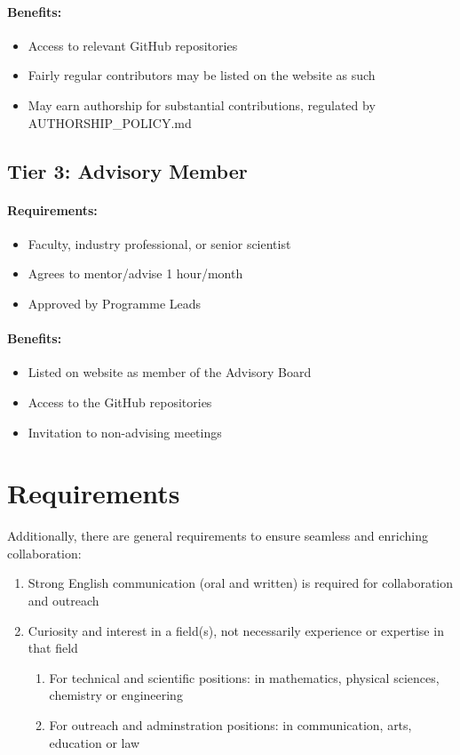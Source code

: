 \documentclass[11pt,a4paper]{article}
\begin{document}
\paragraph{Benefits:}
\begin{itemize}
\item Access to relevant GitHub repositories
\item Fairly regular contributors may be listed on the website as such
\item May earn authorship for substantial contributions, regulated by AUTHORSHIP\_POLICY.md
\end{itemize}

\subsection{Tier 3: Advisory Member}
\paragraph{Requirements:}
\begin{itemize}
\item Faculty, industry professional, or senior scientist
\item Agrees to mentor/advise 1 hour/month
\item Approved by Programme Leads
\end{itemize}

\paragraph{Benefits:}
\begin{itemize}
\item Listed on website as member of the Advisory Board
\item Access to the GitHub repositories
\item Invitation to non-advising meetings
\end{itemize}


\section{Requirements}

Additionally, there are general requirements to ensure seamless and enriching collaboration:
\begin{enumerate}
\item Strong English communication (oral and written) is required for collaboration and outreach
\item Curiosity and interest in a field(s), not necessarily experience or expertise in that field
    \begin{enumerate}
    \item For technical and scientific positions: in mathematics, physical sciences, chemistry or engineering
    \item For outreach and adminstration positions: in communication, arts, education or law
    \end{enumerate}
\end{enumerate}
\end{document}
